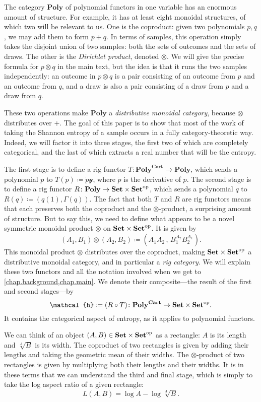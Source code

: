 \documentclass[11pt, one side, article]{memoir}
\theoremstyle{definition}
\theoremstyle{plain}
\newcommand{\Cat}[1]{\mathbf{#1}}%
\newcommand{\op}{^\tn{op}}
\newcommand{\tn}[1]{\textnormal{#1}}
\newcommand{\smset}{\Cat{Set}}
\newcommand{\yon}{\mathcal{y}}
\newcommand{\poly}{\Cat{Poly}}
\newcommand{\polycart}{\poly^{\Cat{Cart}}}
\newcommand{\hh}{\mathcal{h}}
\newcommand{\0}{\textsf{0}}
\newcommand{\1}{\tn{\textsf{1}}}
\newcommand{\R}{R}
\newcommand{\T}{T}
\begin{document}
The category $\poly$ of polynomial functors in one variable has an enormous amount of structure. For example, it has at least eight monoidal structures, of which two will be relevant to us. One is the coproduct: given two polynomials $p,q$, we may add them to form $p+q$. In terms of samples, this operation simply takes the disjoint union of two samples: both the sets of outcomes and the sets of draws. The other is the \emph{Dirichlet product}, denoted $\otimes$. We will give the precise formula for $p\otimes q$ in the main text, but the idea is that it runs the two samples independently: an outcome in $p\otimes q$ is a pair consisting of an outcome from $p$ and an outcome from $q$, and a draw is also a pair consisting of a draw from $p$ and a draw from $q$.

These two operations make $\poly$ a \emph{distributive monoidal category}, because $\otimes$ distributes over $+$. The goal of this paper is to show that most of the work of taking the Shannon entropy of a sample occurs in a fully category-theoretic way. Indeed, we will factor it into three stages, the first two of which are completely categorical, and the last of which extracts a real number that will be the entropy. 

The first stage is to define a rig functor $\T\colon\polycart\to\poly$, which sends a polynomial $p$ to $\T(p)\coloneqq\dot{p}\yon$, where $\dot{p}$ is the derivative of $p$. The second stage is to define a rig functor $\R\colon\poly\to\smset\times\smset\op$, which sends a polynomial $q$ to $\R(q)\coloneqq(q(1),\Gamma(q))$. The fact that both $\T$ and $\R$ are rig functors means that each preserves both the coproduct and the $\otimes$-product, a surprising amount of structure. But to say this, we need to define what appears to be a novel symmetric monoidal product $\otimes$ on $\smset\times\smset\op$. It is given by
\[
	(A_1,B_1)\otimes(A_2,B_2)\coloneqq\left(A_1A_2\,,\,B_1^{A_2}B_2^{A_1}\right).
\]
This monoidal product $\otimes$ distributes over the coproduct, making $\smset\times\smset\op$ a distributive monoidal category, and in particular a \emph{rig category}. We will explain these two functors and all the notation involved when we get to \cref{chap.background,chap.main}. We denote their composite---the result of the first and second stages---by
\[\hh\coloneqq(\R\circ\T)\colon\polycart\to\smset\times\smset\op.\]
It contains the categorical aspect of entropy, as it applies to polynomial functors.

We can think of an object $(A,B)\in\smset\times\smset\op$ as a rectangle: $A$ is its length and $\sqrt[A]{B}$ is its width. The coproduct of two rectangles is given by adding their lengths and taking the geometric mean of their widths. The $\otimes$-product of two rectangles is given by multiplying both their lengths and their widths. It is in these terms that we can understand the third and final stage, which is simply to take the log aspect ratio of a given rectangle:
\[L(A,B)=\log A-\log\sqrt[A]{B}.\]
\end{document}
